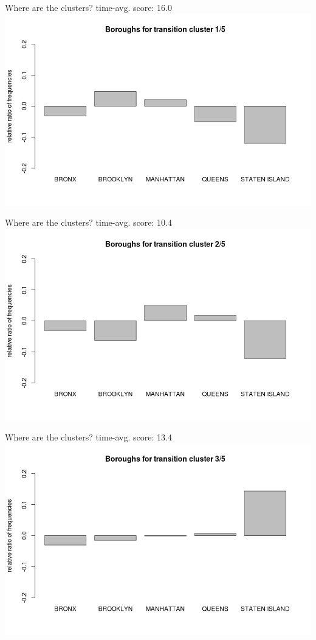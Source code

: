 \documentclass[12pt]{beamer}
\begin{document}
\begin{frame}{Where are the clusters?}
time-avg. score: 16.0
\includegraphics[width=\textwidth]{plots/boro_trans_1}
\end{frame}
\begin{frame}{Where are the clusters?}
time-avg. score: 10.4
\includegraphics[width=\textwidth]{plots/boro_trans_2}
\end{frame}
\begin{frame}{Where are the clusters?}
time-avg. score: 13.4
\includegraphics[width=\textwidth]{plots/boro_trans_3}
\end{frame}
\end{document}
